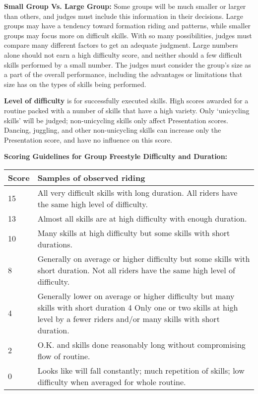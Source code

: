 \textbf{Small Group Vs. Large Group:} Some groups will be much smaller or larger than others, and judges must include this information in their decisions.
Large groups may have a tendency toward formation riding and patterns, while smaller groups may focus more on difficult skills.
With so many possibilities, judges must compare many different factors to get an adequate judgment.
Large numbers alone should not earn a high difficulty score, and neither should a few difficult skills performed by a small number.
The judges must consider the group's size as a part of the overall performance, including the advantages or limitations that size has on the types of skills being performed.

\textbf{Level of difficulty} is for successfully executed skills.
High scores awarded for a routine packed with a number of skills that have a high variety.
Only `unicycling skills' will be judged; non-unicycling skills only affect Presentation scores.
Dancing, juggling, and other non-unicycling skills can increase only the Presentation score, and have no influence on this score.

\begin{minipage}{\textwidth}
\textbf{Scoring Guidelines for Group Freestyle Difficulty and Duration:}\\

\begin{tabular}{|l|p{12.5cm}|}
\hline
\textbf{Score} & \textbf{Samples of observed riding} \\
\hline
15 & All very difficult skills with long duration.
All riders have the same high level of difficulty. \\
\hline
13 & Almost all skills are at high difficulty with enough duration. \\
\hline
10 & Many skills at high difficulty but some skills with short durations. \\
\hline
8 & Generally on average or higher difficulty but some skills with short duration.
Not all riders have the same high level of difficulty. \\
\hline
4 & Generally lower on average or higher difficulty but many skills with short duration 4 Only one or two skills at high level by a fewer riders and/or many skills with short duration. \\
\hline
2 & O.K. and skills done reasonably long without compromising flow of routine. \\
\hline
0 & Looks like will fall constantly; much repetition of skills; low difficulty when averaged for whole routine. \\
\hline
\end{tabular}
\end{minipage}

